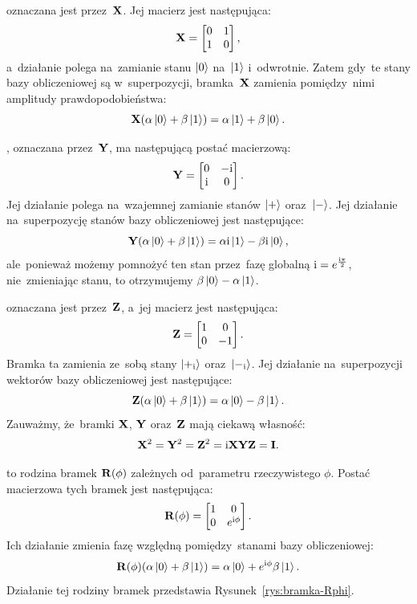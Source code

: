 oznaczana jest przez~$\mathbf{X}$. Jej macierz jest następująca:
$$\mathbf{X}=\begin{bmatrix} 0 & 1 \\ 1 & 0\end{bmatrix},$$
a~działanie polega na~zamianie stanu $\ket{0}$ na~$\ket{1}$
i~odwrotnie. Zatem gdy~te stany bazy obliczeniowej są w~superpozycji,
bramka~$\mathbf{X}$ zamienia pomiędzy~nimi amplitudy prawdopodobieństwa:
$$\mathbf{X} (\alpha\ket{0} + \beta\ket{1}) = \alpha\ket{1} + \beta\ket{0}.$$

, oznaczana przez~$\mathbf{Y}$,
ma następującą postać macierzową:
$$\mathbf{Y} = \begin{bmatrix} 0&-{\mathrm i}\\ {\mathrm i}&0 \end{bmatrix}.$$
Jej działanie polega na~wzajemnej zamianie stanów $\ket{+}$ oraz~$\ket{-}$.
Jej działanie na~superpozycję stanów bazy obliczeniowej jest następujące:
$$\mathbf{Y} (\alpha\ket{0} + \beta\ket{1}) = \alpha{\mathrm i}\ket{1} - \beta{\mathrm i} \ket{0},$$
ale~ponieważ możemy pomnożyć ten stan przez~fazę globalną ${\mathrm i}=e^{\frac{{\mathrm i} \pi}{2}}$, nie~zmieniając
stanu, to otrzymujemy $\beta\ket{0}-\alpha\ket{1}$.

 oznaczana jest przez~$\mathbf{Z}$,
a~jej macierz jest następująca:
$$\mathbf{Z} = \begin{bmatrix} 1 & 0 \\ 0 & -1\end{bmatrix}.$$
Bramka ta zamienia ze~sobą stany $\ket{+_{\mathrm i}}$ oraz~$\ket{-_{\mathrm i}}$.
Jej działanie na~superpozycji wektorów bazy obliczeniowej jest następujące:
$$\mathbf{Z} (\alpha\ket{0} + \beta\ket{1}) = \alpha\ket{0} - \beta\ket{1}.$$
Zauważmy, że~bramki $\mathbf{X}$, $\mathbf{Y}$ oraz~$\mathbf{Z}$ mają ciekawą własność:
$$\mathbf{X}^2=\mathbf{Y}^2=\mathbf{Z}^2={\mathrm i}\mathbf{X}\mathbf{Y}\mathbf{Z}=\mathbf{I}.$$

to rodzina bramek $\mathbf{R}(\phi)$ zależnych od~parametru rzeczywistego $\phi$.
Postać macierzowa tych bramek jest następująca:
$$\mathbf{R}(\phi) = \begin{bmatrix} 1 & 0 \\ 0 & e^{{\mathrm i} \phi} \end{bmatrix}.$$
Ich działanie zmienia fazę względną pomiędzy~stanami bazy obliczeniowej:
$$\mathbf{R}(\phi) (\alpha\ket{0} + \beta\ket{1}) = \alpha\ket{0} +  e^{{\mathrm i} \phi} \beta\ket{1}.$$
Działanie tej rodziny bramek przedstawia Rysunek~\ref{rys:bramka-Rphi}.

